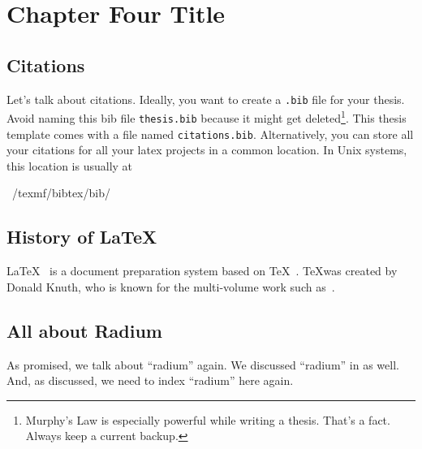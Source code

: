 
\chapter{Chapter Four Title}
\label{chap:chapterfourname}
\doublespacing

\section{Citations}
\label{sec:chapterfourname:citations}

Let's talk about citations. Ideally, you want to create a \texttt{.bib} file 
for your thesis. Avoid naming this bib file \texttt{thesis.bib} because it might 
get deleted\footnote{Murphy's Law is especially powerful while writing 
a thesis. That's a fact. Always keep a current backup.}.
This thesis template comes with a file named \texttt{citations.bib}. 
Alternatively, you can store all your citations for all your latex projects 
in a common location. In Unix systems, this location is usually at 
\begin{code}
~/texmf/bibtex/bib/
\end{code}


\section{History of \LaTeX}
\label{sec:chapterfourname:history_of_latex}

\LaTeX~\cite{lamport:1986} is a document preparation system based on 
\TeX~\cite{knuth:1999}. \TeX was created by Donald Knuth, who is known 
for the multi-volume work such as~\citet{knuth:1997}.



\section{All about Radium}
\label{sec:chapterfourname:all_about_radium}

As promised, we talk about ``radium'' again. We discussed ``radium'' 
in \chaptertwoname{} as well. And, as discussed, we need to index ``radium'' 
here again. 


